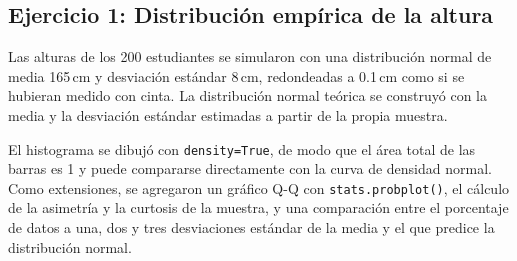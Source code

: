 \documentclass[11pt,letterpaper]{article}
\begin{document}
\subsection{Ejercicio 1: Distribución empírica de la altura}

Las alturas de los 200 estudiantes se simularon con una distribución normal de media 165\,cm y desviación estándar 8\,cm, redondeadas a 0.1\,cm como si se hubieran medido con cinta. La distribución normal teórica se construyó con la media y la desviación estándar estimadas a partir de la propia muestra.

El histograma se dibujó con \texttt{density=True}, de modo que el área total de las barras es 1 y puede compararse directamente con la curva de densidad normal. Como extensiones, se agregaron un gráfico Q-Q con \texttt{stats.probplot()}, el cálculo de la asimetría y la curtosis de la muestra, y una comparación entre el porcentaje de datos a una, dos y tres desviaciones estándar de la media y el que predice la distribución normal.
\end{document}
